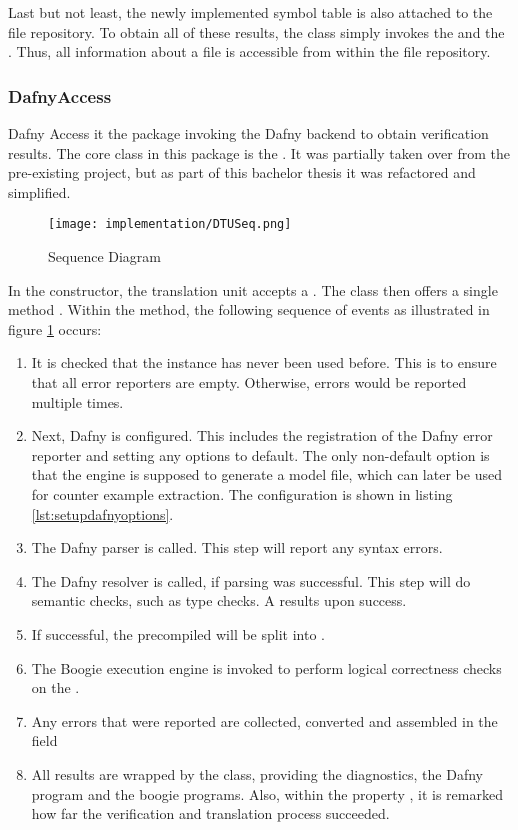Last but not least, the newly implemented symbol table is also attached to the file repository.
To obtain all of these results, the class simply invokes the  and the .
Thus, all information about a file is accessible from within the file repository.

\subsubsection{DafnyAccess}
Dafny Access it the package invoking the Dafny backend to obtain verification results.
The core class in this package is the .
It was partially taken over from the pre-existing project, but as part of this bachelor thesis it was refactored and simplified.\\

\begin{figure}[H]
    \centering
    \texttt{[image: implementation/DTUSeq.png]}
    \caption{ Sequence Diagram}
    \label{fig:DTUSeq}
\end{figure}

In the constructor, the translation unit accepts a .
The class then offers a single method .
Within the method, the following sequence of events as illustrated in figure \ref{fig:DTUSeq} occurs:

\begin{enumerate}
    \item It is checked that the instance has never been used before.
    This is to ensure that all error reporters are empty.
    Otherwise, errors would be reported multiple times.
    \item Next, Dafny is configured.
    This includes the registration of the Dafny error reporter and setting any options to default.
    The only non-default option is that the engine is supposed to generate a model file, which can later be used for counter example extraction.
    The configuration is shown in listing \ref{lst:setupdafnyoptions}.
    \item The Dafny parser is called.
    This step will report any syntax errors.
    \item The Dafny resolver is called, if parsing was successful.
    This step will do semantic checks, such as type checks.
    A  results upon success.
    \item If successful, the precompiled  will be split into .
    \item The Boogie execution engine is invoked to perform logical correctness checks on the .
    \item Any errors that were reported are collected, converted and assembled in the field 
    \item All results are wrapped by the  class, providing the diagnostics, the Dafny program and the boogie programs.
    Also, within the property , it is remarked how far the verification and translation process succeeded.
\end{enumerate}


